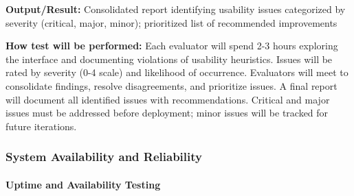 \documentclass[12pt, titlepage]{article}
\begin{document}
\begin{enumerate}
\textbf{Output/Result:} Consolidated report identifying usability issues categorized by severity (critical, major, minor); prioritized list of recommended improvements
					
\textbf{How test will be performed:} Each evaluator will spend 2-3 hours exploring the interface and documenting violations of usability heuristics. Issues will be rated by severity (0-4 scale) and likelihood of occurrence. Evaluators will meet to consolidate findings, resolve disagreements, and prioritize issues. A final report will document all identified issues with recommendations. Critical and major issues must be addressed before deployment; minor issues will be tracked for future iterations.

\end{enumerate}

\subsubsection{System Availability and Reliability}

\paragraph{Uptime and Availability Testing}
\end{document}
